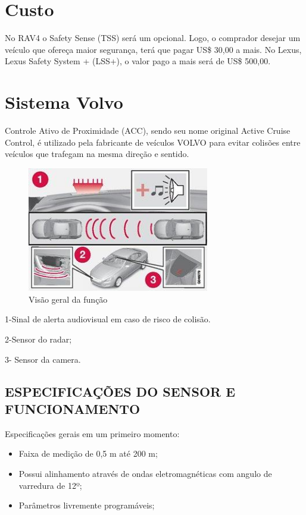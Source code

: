 \section{Custo}

  No RAV4 o Safety Sense (TSS) será um opcional. Logo, o comprador desejar um
  veículo que ofereça maior segurança, terá que pagar US\$ 30,00 a mais. No
  Lexus,  Lexus Safety System + (LSS+), o valor pago a mais será de US\$
  500,00.  \cite{1comper}

\section{Sistema Volvo}

Controle Ativo de Proximidade (ACC), sendo seu nome original Active Cruise
Control, é utilizado pela fabricante de veículos VOLVO para evitar colisões
entre veículos que trafegam na mesma direção e sentido.

\begin{figure}[h]
  \centering
  \includegraphics[width=300px, scale=1]{figuras/esquematico_volvo}
  \caption{Visão geral da função \cite{8comper}}
\label{fig:esquematico_volvo}
\end{figure}

1-Sinal de alerta audiovisual em caso de risco de colisão.

2-Sensor do radar;

3- Sensor da camera.

\subsection{ESPECIFICAÇÕES DO SENSOR E FUNCIONAMENTO}

Especificações gerais em um primeiro momento:

\begin{itemize}
  \item Faixa de medição de 0,5 m até 200 m;
  \item Possui alinhamento através de ondas eletromagnéticas com angulo de varredura de 12º;
  \item Parâmetros livremente programáveis;
\end{itemize}

